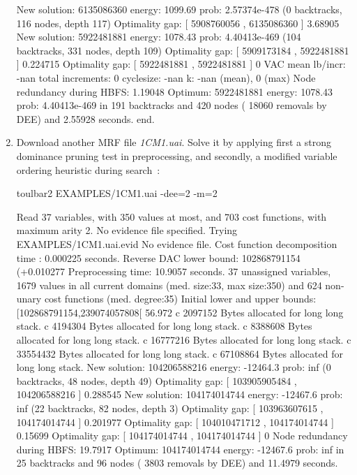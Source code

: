 \begin{enumerate}
{\begin{DoxyCode}
New solution: 6135086360 energy: 1099.69 prob: 2.57374e-478 (0 backtracks, 116 nodes, depth 117)
Optimality gap: [ 5908760056 , 6135086360 ] 3.68905 %
New solution: 5922481881 energy: 1078.43 prob: 4.40413e-469 (104 backtracks, 331 nodes, depth 109)
Optimality gap: [ 5909173184 , 5922481881 ] 0.224715 %
Optimality gap: [ 5922481881 , 5922481881 ] 0 %
VAC mean lb/incr: -nan     total increments: 0     cyclesize: -nan     k: -nan (mean), 0 (max)
Node redundancy during HBFS: 1.19048 %
Optimum: 5922481881 energy: 1078.43 prob: 4.40413e-469 in 191 backtracks and 420 nodes ( 18060 removals by DEE) and 2.55928 seconds.
end.
\end{DoxyCode}}
\item Download another MRF file {\em 1CM1.uai}. Solve it by applying first a strong dominance pruning test in preprocessing, and secondly, a modified variable ordering heuristic during search~\cite{Schiex14a}:
\begin{DoxyCode}
	toulbar2 EXAMPLES/1CM1.uai -dee=2 -m=2
\end{DoxyCode}
{\scriptsize
\begin{DoxyCode}
Read 37 variables, with 350 values at most, and 703 cost functions, with maximum arity 2.
No evidence file specified. Trying EXAMPLES/1CM1.uai.evid
No evidence file. 
Cost function decomposition time : 0.000225 seconds.
Reverse DAC lower bound: 102868791154 (+0.010277%
Preprocessing time: 10.9057 seconds.
37 unassigned variables, 1679 values in all current domains (med. size:33, max size:350) and 624 non-unary cost functions (med. degree:35)
Initial lower and upper bounds: [102868791154,239074057808[ 56.972%
c 2097152 Bytes allocated for long long stack.
c 4194304 Bytes allocated for long long stack.
c 8388608 Bytes allocated for long long stack.
c 16777216 Bytes allocated for long long stack.
c 33554432 Bytes allocated for long long stack.
c 67108864 Bytes allocated for long long stack.
New solution: 104206588216 energy: -12464.3 prob: inf (0 backtracks, 48 nodes, depth 49)
Optimality gap: [ 103905905484 , 104206588216 ] 0.288545 %
New solution: 104174014744 energy: -12467.6 prob: inf (22 backtracks, 82 nodes, depth 3)
Optimality gap: [ 103963607615 , 104174014744 ] 0.201977 %
Optimality gap: [ 104010471712 , 104174014744 ] 0.15699 %
Optimality gap: [ 104174014744 , 104174014744 ] 0 %
Node redundancy during HBFS: 19.7917 %
Optimum: 104174014744 energy: -12467.6 prob: inf in 25 backtracks and 96 nodes ( 3803 removals by DEE) and 11.4979 seconds.

\end{DoxyCode}}
\end{enumerate}
